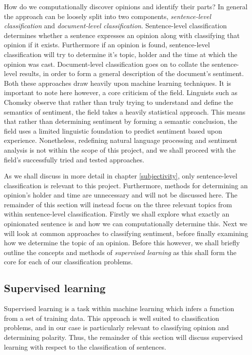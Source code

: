 How do we computationally discover opinions and identify their parts? In general the approach can be loosely split into two components, \emph{sentence-level classification} and \emph{document-level classification}. Sentence-level classification determines whether a sentence expresses an opinion along with classifying that opinion if it exists. Furthermore if an opinion is found, sentence-level classification will try to determine it's topic, holder and the time at which the opinion was cast. Document-level classification goes on to collate the sentence-level results, in order to form a general description of the document's sentiment. Both these approaches draw heavily upon machine learning techniques. It is important to note here however, a core criticism of the field. Linguists such as Chomsky \cite{norvig} observe that rather than truly trying to understand and define the semantics of sentiment, the field takes a heavily statistical approach. This means that rather than determining sentiment by forming a semantic conclusion, the field uses a limited linguistic foundation to predict sentiment based upon experience. Nonetheless, redefining natural language processing and sentiment analysis is not within the scope of this project, and we shall proceed with the field's successfully tried and tested approaches.

As we shall discuss in more detail in chapter \ref{subjectivity}, only sentence-level classification is relevant to this project. Furthermore, methods for determining an opinion's holder and time are unnecessary and will not be discussed here. The remainder of this section will instead focus on the three relevant topics from within sentence-level classification. Firstly we shall explore what exactly an opinionated sentence is and how we can computationally determine this. Next we will look at common approaches to classifying sentiment, before finally examining how we determine the topic of an opinion. Before this however, we shall briefly outline the concepts and methods of \emph{supervised learning} as this shall form the core for each of our classification problems.

\subsection{Supervised learning}
\label{background:supervised_learning}

Supervised learning is a task within machine learning which infers a function from a set of training data. This approach is well suited to classification problems, and in our case is particularly relevant to classifying opinion and determining polarity. Thus, the remainder of this section will discuss supervised learning with respect to the classification of sentences. 

